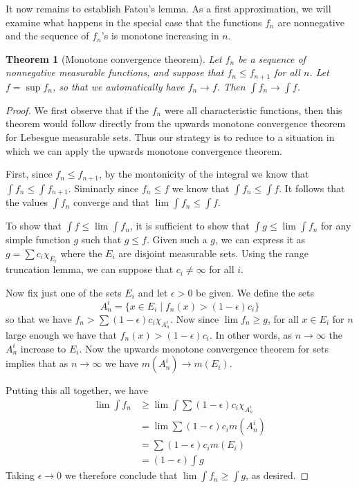 \documentclass[11pt,oneside]{amsbook}
\theoremstyle{definition}
\theoremstyle{plain}
\newtheorem{thm}{Theorem}[section]
\theoremstyle{definition}
\theoremstyle{remark}
\numberwithin{equation}{section}
\numberwithin{figure}{section}
\begin{document}
It now remains to establish Fatou's lemma. As a first approximation, we will examine what happens in the special case that the functions $f_n$ are nonnegative and the sequence of $f_n$'s is monotone increasing in $n$.

\begin{thm}[Monotone convergence theorem]
  Let $f_n$ be a sequence of nonnegative measurable functions, and suppose that $f_n\leq f_{n+1}$ for all $n$. Let $f=\sup f_n$, so that we automatically have $f_n\to f$. Then $\int f_n\to\int f$.
\end{thm}

\begin{proof}
  We first observe that if the $f_n$ were all characteristic functions, then this theorem would follow directly from the upwards monotone convergence theorem for Lebesgue measurable sets. Thus our strategy is to reduce to a situation in which we can apply the upwards monotone convergence theorem.

  First, since $f_n\leq f_{n+1}$, by the montonicity of the integral we know that $\int f_n\leq\int f_{n+1}$. Siminarly since $f_n\leq f$ we know that $\int f_n\leq\int f$. It follows that the values $\int f_n$ converge and that $\lim\int f_n\leq\int f$.

  To show that $\int f\leq\lim\int f_n$, it is sufficient to show that $\int g\leq \lim\int f_n$ for any simple function $g$ such that $g\leq f$. Given such a $g$, we can express it as $g=\sum c_i\chi_{E_i}$ where the $E_i$ are disjoint measurable sets. Using the range truncation lemma, we can suppose that $c_i\neq\infty$ for all $i$.

  Now fix just one of the sets $E_i$ and let $\epsilon>0$ be given. We define the sets
  \[A_n^i=\{x\in E_i\mid f_n(x)>(1-\epsilon)c_i\}
  \]
  so that we have $f_n>\sum(1-\epsilon)c_i\chi_{A_n^i}$. Now since $\lim f_n\geq g$, for all $x\in E_i$ for $n$ large enough we have that $f_n(x)>(1-\epsilon)c_i$. In other words, as $n\to\infty$ the $A_n^i$ increase to $E_i$. Now the upwards monotone convergence theorem for sets implies that as $n\to\infty$ we have $m(A_n^i)\to m(E_i)$.

  Putting this all together, we have
  \begin{align*}
    \lim\int f_n&\geq\lim\int\sum(1-\epsilon)c_i\chi_{A_n^i}\\
                &=\lim\sum (1-\epsilon)c_im(A_n^i)\\
                &=\sum (1-\epsilon)c_im(E_i)\\
                &=(1-\epsilon)\int g
  \end{align*}
  Taking $\epsilon\to0$ we therefore conclude that $\lim\int f_n\geq\int g$, as desired.  
\end{proof}
\end{document}
